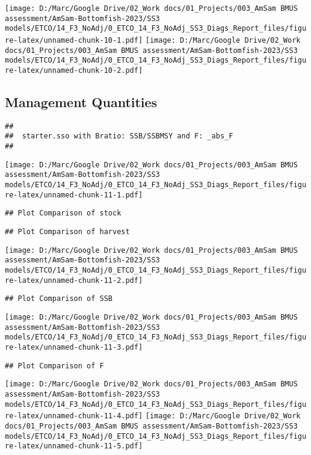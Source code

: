 \documentclass[
]{article}
\begin{document}
\texttt{[image: D:/Marc/Google Drive/02\_Work docs/01\_Projects/003\_AmSam BMUS assessment/AmSam-Bottomfish-2023/SS3 models/ETCO/14\_F3\_NoAdj/0\_ETCO\_14\_F3\_NoAdj\_SS3\_Diags\_Report\_files/figure-latex/unnamed-chunk-10-1.pdf]}
\texttt{[image: D:/Marc/Google Drive/02\_Work docs/01\_Projects/003\_AmSam BMUS assessment/AmSam-Bottomfish-2023/SS3 models/ETCO/14\_F3\_NoAdj/0\_ETCO\_14\_F3\_NoAdj\_SS3\_Diags\_Report\_files/figure-latex/unnamed-chunk-10-2.pdf]}

\hypertarget{management-quantities}{%
\subsection{Management Quantities}\label{management-quantities}}

\begin{verbatim}
## 
##  starter.sso with Bratio: SSB/SSBMSY and F: _abs_F 
## 
\end{verbatim}

\texttt{[image: D:/Marc/Google Drive/02\_Work docs/01\_Projects/003\_AmSam BMUS assessment/AmSam-Bottomfish-2023/SS3 models/ETCO/14\_F3\_NoAdj/0\_ETCO\_14\_F3\_NoAdj\_SS3\_Diags\_Report\_files/figure-latex/unnamed-chunk-11-1.pdf]}

\begin{verbatim}
## Plot Comparison of stock
\end{verbatim}

\begin{verbatim}
## Plot Comparison of harvest
\end{verbatim}

\texttt{[image: D:/Marc/Google Drive/02\_Work docs/01\_Projects/003\_AmSam BMUS assessment/AmSam-Bottomfish-2023/SS3 models/ETCO/14\_F3\_NoAdj/0\_ETCO\_14\_F3\_NoAdj\_SS3\_Diags\_Report\_files/figure-latex/unnamed-chunk-11-2.pdf]}

\begin{verbatim}
## Plot Comparison of SSB
\end{verbatim}

\texttt{[image: D:/Marc/Google Drive/02\_Work docs/01\_Projects/003\_AmSam BMUS assessment/AmSam-Bottomfish-2023/SS3 models/ETCO/14\_F3\_NoAdj/0\_ETCO\_14\_F3\_NoAdj\_SS3\_Diags\_Report\_files/figure-latex/unnamed-chunk-11-3.pdf]}

\begin{verbatim}
## Plot Comparison of F
\end{verbatim}

\texttt{[image: D:/Marc/Google Drive/02\_Work docs/01\_Projects/003\_AmSam BMUS assessment/AmSam-Bottomfish-2023/SS3 models/ETCO/14\_F3\_NoAdj/0\_ETCO\_14\_F3\_NoAdj\_SS3\_Diags\_Report\_files/figure-latex/unnamed-chunk-11-4.pdf]}
\texttt{[image: D:/Marc/Google Drive/02\_Work docs/01\_Projects/003\_AmSam BMUS assessment/AmSam-Bottomfish-2023/SS3 models/ETCO/14\_F3\_NoAdj/0\_ETCO\_14\_F3\_NoAdj\_SS3\_Diags\_Report\_files/figure-latex/unnamed-chunk-11-5.pdf]}
\end{document}
